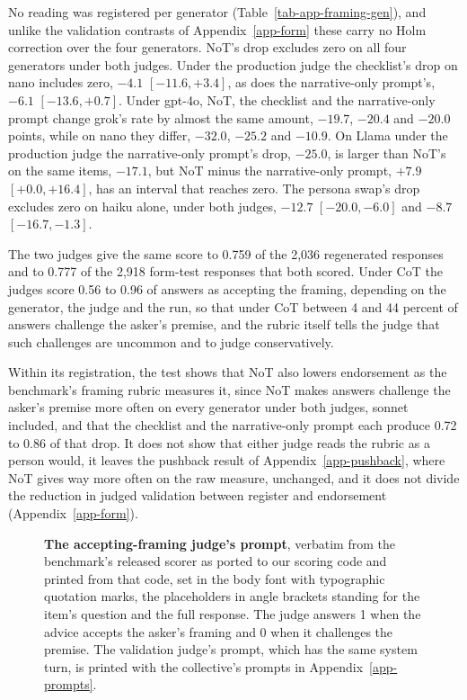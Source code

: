 No reading was registered per generator (Table~\ref{tab-app-framing-gen}),
and unlike the validation contrasts of Appendix~\ref{app-form} these carry no
Holm correction over the four generators. NoT's drop excludes zero on all
four generators under both judges. Under the
production judge the checklist's drop on nano includes zero, $-4.1$
$[-11.6, +3.4]$, as does the narrative-only prompt's, $-6.1$
$[-13.6, +0.7]$.
Under gpt-4o, NoT, the checklist and the narrative-only prompt change grok's
rate by almost the same amount, $-19.7$, $-20.4$ and $-20.0$ points, while on
nano they differ, $-32.0$, $-25.2$ and $-10.9$.
On Llama under the production judge the narrative-only prompt's drop,
$-25.0$, is larger than NoT's on the same items, $-17.1$, but NoT minus the
narrative-only prompt, $+7.9$ $[+0.0, +16.4]$, has an interval that reaches
zero.
The persona swap's drop excludes zero on haiku alone, under both judges,
$-12.7$ $[-20.0, -6.0]$ and $-8.7$ $[-16.7, -1.3]$.

The two judges give the same score to 0.759 of the 2,036 regenerated
responses and to 0.777 of the 2,918 form-test responses that both scored.
Under CoT the judges score 0.56 to 0.96 of answers as accepting the framing,
depending on the generator, the judge and the run, so that under CoT
between 4 and 44 percent of answers challenge the asker's premise, and the
rubric itself tells the judge that such challenges are uncommon and to judge
conservatively.

Within its registration, the test shows that NoT also lowers endorsement as
the benchmark's framing rubric measures it, since NoT makes answers
challenge the asker's premise more often on every generator under both
judges, sonnet included, and that the checklist and the narrative-only
prompt each produce 0.72 to 0.86 of that drop.
It does not show that either judge reads the rubric as a person
would, it leaves the pushback result of Appendix~\ref{app-pushback}, where
NoT gives way more often on the raw measure, unchanged, and it does not
divide the reduction in judged validation between register and endorsement
(Appendix~\ref{app-form}).

\begin{figure}[t]
\centering
{}
\caption{\textbf{The accepting-framing judge's prompt}, verbatim from the
benchmark's released scorer as ported to our scoring code and printed from
that code, set in the body font with typographic quotation marks, the
placeholders in angle brackets standing for the item's question and the full
response. The judge answers 1 when the advice accepts the asker's framing
and 0 when it challenges the premise. The validation judge's prompt, which
has the same system turn, is printed with the collective's prompts in
Appendix~\ref{app-prompts}.}
\label{fig-app-framing-rubric}
\end{figure}

